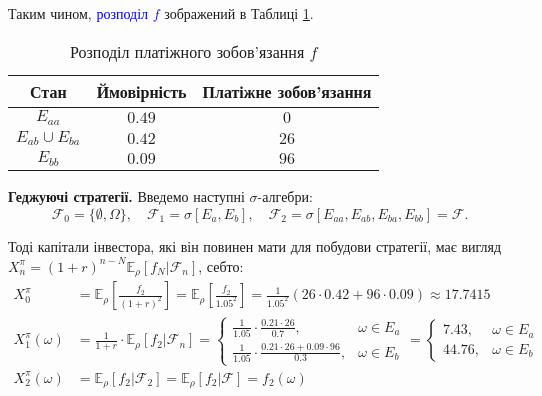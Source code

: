 \documentclass{test_template}
\begin{document}
Таким чином, \textcolor{blue}{розподіл $f$} зображений в Таблиці
\ref{tab:distribution}.
\begin{table}[h!]
    \centering
    \begin{tabular}{ccc}
        \hline
        \rowcolor{gray!20} \textbf{Стан} & \textbf{Ймовірність} & \textbf{Платіжне зобов'язання} \\ \hline
        $E_{aa}$ & $0.49$ & $0$ \\ \hline
        $E_{ab}\cup E_{ba}$ & $0.42$ & $26$ \\ \hline
        $E_{bb}$ & $0.09$ & $96$ \\ \hline
    \end{tabular}
    \caption{Розподіл платіжного зобов'язання $f$}
    \label{tab:distribution}
\end{table}

\textcolor{green!50!black}{\textbf{Геджуючі стратегії.}} Введемо наступні
$\sigma$-алгебри:
\begin{equation*}
    \mathcal{F}_0 = \{\emptyset, \Omega\}, \quad \mathcal{F}_1 = \sigma[E_a,E_b], \quad \mathcal{F}_2 = \sigma[E_{aa}, E_{ab}, E_{ba}, E_{bb}] = \mathcal{F}.
\end{equation*}

Тоді капітали інвестора, які він повинен мати для побудови стратегії, має 
вигляд $X_n^{\pi} = (1+r)^{n-N}\mathbb{E}_{\rho}[f_N|\mathcal{F}_n]$, себто:
\begin{align*}
    X_0^{\pi} &= \mathbb{E}_{\rho}\left[\frac{f_2}{(1+r)^2}\right] = \mathbb{E}_{\rho}\left[\frac{f_2}{1.05^2}\right] = \frac{1}{1.05^2}\left(26 \cdot 0.42 + 96 \cdot 0.09\right) \approx 17.7415 \\
    X_1^{\pi}(\omega) &= \frac{1}{1+r} \cdot \mathbb{E}_{\rho}\left[f_2 | \mathcal{F}_n\right] = \begin{cases}
        \frac{1}{1.05} \cdot \frac{0.21 \cdot 26}{0.7}, & \omega \in E_a \\
        \frac{1}{1.05} \cdot \frac{0.21 \cdot 26 + 0.09 \cdot 96}{0.3}, & \omega \in E_b
    \end{cases} = \begin{cases}
        7.43, & \omega \in E_a \\
        44.76, & \omega \in E_b
    \end{cases} \\
    X_2^{\pi}(\omega) &= \mathbb{E}_{\rho}[f_2|\mathcal{F}_2] = \mathbb{E}_{\rho}[f_2|\mathcal{F}] = f_2(\omega)
\end{align*}
\end{document}
